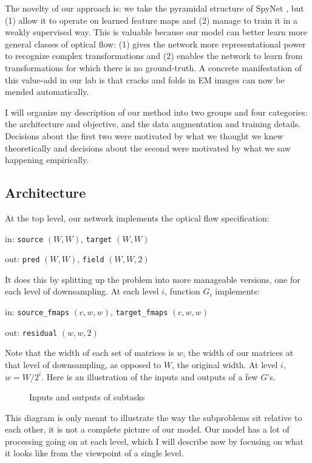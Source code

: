 \documentclass[12pt,a4paper]{article}
\begin{document}
The novelty of our approach is: we take the pyramidal structure of SpyNet \cite{spynet}, but (1) allow it to operate on learned feature maps and (2) manage to train it in a weakly supervised way. This is valuable because our model can better learn more general classes of optical flow: (1) gives the network more representational power to recognize complex transformations and (2) enables the network to learn from transformations for which there is no ground-truth. A concrete manifestation of this value-add in our lab is that cracks and folds in EM images can now be mended automatically.

I will organize my description of our method into two groups and four categories: the architecture and objective, and the data augmentation and training details. Decisions about the first two were motivated by what we thought we knew theoretically and decisions about the second were motivated by what we saw happening empirically.

\subsection{Architecture}

At the top level, our network implements the optical flow specification:

\indent in: {\tt source} $(W, W)$, {\tt target} $(W, W)$

out: {\tt pred} $(W, W)$, {\tt field} $(W, W, 2)$

It does this by splitting up the problem into more manageable versions, one for each level of downsampling. At each level $i$, function $G_i$ implements:

\indent in: {\tt source\_fmaps} $(c, w, w)$, {\tt target\_fmaps} $(c, w, w)$

out: {\tt residual} $(w, w, 2)$

Note that the width of each set of matrices is $w$, the width of our matrices at that level of downsampling, as opposed to $W$, the original width. At level $i$, $w = W / 2^i$. Here is an illustration of the inputs and outputs of a few $G$'s. 

\begin{figure}[H]%
    \caption{Inputs and outputs of subtasks}%
    \label{fig:example}%
\end{figure}

This diagram is only meant to illustrate the way the subproblems sit relative to each other, it is not a complete picture of our model. Our model has a lot of processing going on at each level, which I will describe now by focusing on what it looks like from the viewpoint of a single level. 
\end{document}
